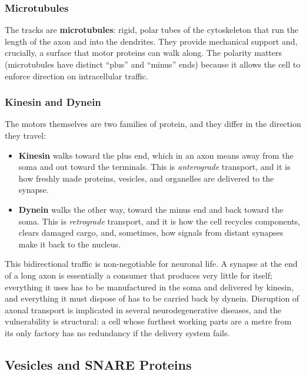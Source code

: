 \documentclass[11pt]{article}
\begin{document}
\subsubsection{Microtubules}

The tracks are \textbf{microtubules}: rigid, polar tubes of the cytoskeleton that run the length of the axon and into the dendrites. They provide mechanical support and, crucially, a surface that motor proteins can walk along. The polarity matters (microtubules have distinct ``plus'' and ``minus'' ends) because it allows the cell to enforce direction on intracellular traffic.

\subsubsection{Kinesin and Dynein}

The motors themselves are two families of protein, and they differ in the direction they travel:

\begin{itemize}
    \item \textbf{Kinesin} walks toward the plus end, which in an axon means away from the soma and out toward the terminals. This is \textit{anterograde} transport, and it is how freshly made proteins, vesicles, and organelles are delivered to the synapse.
    \item \textbf{Dynein} walks the other way, toward the minus end and back toward the soma. This is \textit{retrograde} transport, and it is how the cell recycles components, clears damaged cargo, and, sometimes, how signals from distant synapses make it back to the nucleus.
\end{itemize}

This bidirectional traffic is non-negotiable for neuronal life. A synapse at the end of a long axon is essentially a consumer that produces very little for itself; everything it uses has to be manufactured in the soma and delivered by kinesin, and everything it must dispose of has to be carried back by dynein. Disruption of axonal transport is implicated in several neurodegenerative diseases, and the vulnerability is structural: a cell whose furthest working parts are a metre from its only factory has no redundancy if the delivery system fails.

\subsection{Vesicles and SNARE Proteins}
\end{document}

